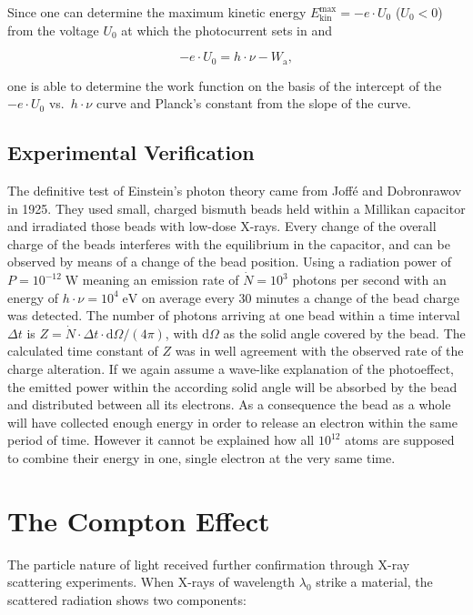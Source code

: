 \documentclass[
  a4paper,
]{book}
\begin{document}
Since one can determine the maximum kinetic energy
\(E_{\mathrm{kin}}^{\mathrm{max}} = -e\cdot U_0\) (\(U_0 < 0\)) from the
voltage \(U_0\) at which the photocurrent sets in and

\[
-e\cdot U_0 = h\cdot\nu -  W_{\mathrm{a}} \mathrm{,}
\]

one is able to determine the work function on the basis of the intercept
of the \(-e\cdot U_0\) vs.~\(h\cdot\nu\) curve and Planck's constant
from the slope of the curve.

\subsection{Experimental
Verification}\label{experimental-verification-1}

The definitive test of Einstein's photon theory came from Joffé and
Dobronrawov in 1925. They used small, charged bismuth beads held within
a Millikan capacitor and irradiated those beads with low-dose X-rays.
Every change of the overall charge of the beads interferes with the
equilibrium in the capacitor, and can be observed by means of a change
of the bead position. Using a radiation power of
\(P = 10^{-12} \; \mathrm{W}\) meaning an emission rate of
\(\dot{N} = 10^3\) photons per second with an energy of
\(h \cdot \nu = 10^4 \; \mathrm{eV}\) on average every 30 minutes a
change of the bead charge was detected. The number of photons arriving
at one bead within a time interval \(\Delta t\) is
\(Z = \dot{N} \cdot \Delta t \cdot \mathrm{d} \Omega/ \left( 4\pi \right)\),
with \(\mathrm{d} \Omega\) as the solid angle covered by the bead. The
calculated time constant of \(Z\) was in well agreement with the
observed rate of the charge alteration. If we again assume a wave-like
explanation of the photoeffect, the emitted power within the according
solid angle will be absorbed by the bead and distributed between all its
electrons. As a consequence the bead as a whole will have collected
enough energy in order to release an electron within the same period of
time. However it cannot be explained how all \(10^{12}\) atoms are
supposed to combine their energy in one, single electron at the very
same time.

\section{The Compton Effect}\label{the-compton-effect}

The particle nature of light received further confirmation through X-ray
scattering experiments. When X-rays of wavelength \(\lambda_0\) strike a
material, the scattered radiation shows two components:
\end{document}
